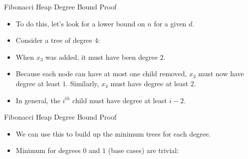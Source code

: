 \documentclass[aspectratio=169]{beamer}
\begin{document}
\begin{frame}{Fibonacci Heap Degree Bound Proof}
    \begin{itemize}
        \item To do this, let's look for a lower bound on $n$ for a given $d$.\pause
        \item Consider a tree of degree $4$:
        \begin{center}
        \end{center}\pause
        \item When $x_3$ was added, it must have been degree $2$.\pause
        \item Because each node can have at most one child removed, $x_3$ must now have degree at least $1$. Similarly, $x_4$ must have degree at least $2$.\pause
        \item In general, the $i^{th}$ child must have degree at least $i - 2$.
    \end{itemize}
\end{frame}
\begin{frame}{Fibonacci Heap Degree Bound Proof}
    \begin{itemize}
        \item We can use this to build up the minimum trees for each degree.\pause
        \item Minimum for degrees $0$ and $1$ (base cases) are trivial:
        \begin{center}
        \end{center}
    \end{itemize}
\end{frame}
\end{document}
